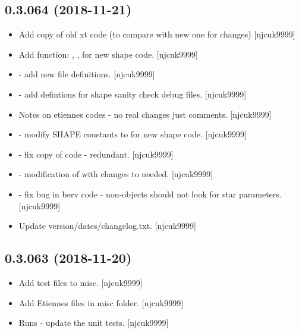 \documentclass[a4paper,10pt,english]{report}
\begin{document}
\subsection{0.3.064 (2018-11-21)}
\label{\detokenize{misc/changelog:id258}}\begin{itemize}
\item {} 
Add copy of old xt code (to compare with new one for changes)
{[}njcuk9999{]}

\item {} 
Add function: , ,  for
new shape code. {[}njcuk9999{]}

\item {} 
 - add new file definitions. {[}njcuk9999{]}

\item {} 
 - add defintions for shape sanity check debug files.
{[}njcuk9999{]}

\item {} 
Notes on etiennes codes - no real changes just comments. {[}njcuk9999{]}

\item {} 
 - modify SHAPE constants to for new shape
code. {[}njcuk9999{]}

\item {} 
 - fix copy of code - redundant. {[}njcuk9999{]}

\item {} 
 - modification of  with
changes to  needed. {[}njcuk9999{]}

\item {} 
 - fix bug in berv code - non-objects should not look for
star parameters. {[}njcuk9999{]}

\item {} 
Update version/dates/changelog.txt. {[}njcuk9999{]}

\end{itemize}


\subsection{0.3.063 (2018-11-20)}
\label{\detokenize{misc/changelog:id259}}\begin{itemize}
\item {} 
Add test files to misc. {[}njcuk9999{]}

\item {} 
Add Etiennes files in misc folder. {[}njcuk9999{]}

\item {} 
Runs - update the unit tests. {[}njcuk9999{]}

\end{itemize}
\end{document}
